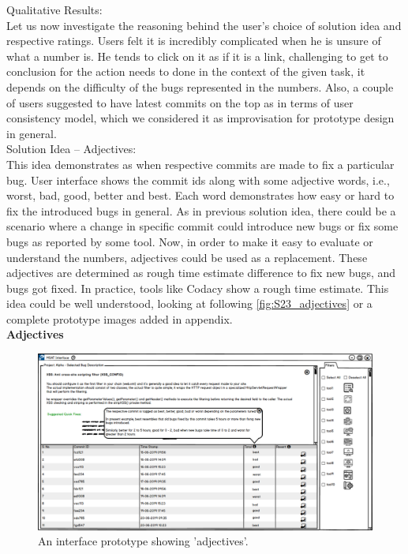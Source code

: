 Qualitative Results: \\

Let us now investigate the reasoning behind the user’s choice of solution idea and respective ratings. Users felt it is incredibly complicated when he is unsure of what a number is. He tends to click on it as if it is a link, challenging to get to conclusion for the action needs to done in the context of the given task, it depends on the difficulty of the bugs represented in the numbers. Also, a couple of users suggested to have latest commits on the top as in terms of user consistency model, which we considered it as improvisation for prototype design in general. \\

Solution Idea – Adjectives: \\

This idea demonstrates as when respective commits are made to fix a particular bug. User interface shows the commit ids along with some adjective words, i.e., worst, bad, good, better and best. Each word demonstrates how easy or hard to fix the introduced bugs in general. As in previous solution idea, there could be a scenario where a change in specific commit could introduce new bugs or fix some bugs as reported by some tool. Now, in order to make it easy to evaluate or understand the numbers, adjectives could be used as a replacement. These adjectives are determined as rough time estimate difference to fix new bugs, and bugs got fixed. In practice, tools like Codacy show a rough time estimate. This idea could be well understood, looking at following \autoref{fig:S23_adjectives} or a complete prototype images added in appendix. \\
\clearpage
\textbf{Adjectives}
\begin{figure}[hbt!]
	\centering
	\includegraphics[width=\linewidth]{figures/solution_ideas_snaps/S23_adjectives}
	\caption{An interface prototype showing 'adjectives'.}
	\label{fig:S23_adjectives}
\end{figure}

